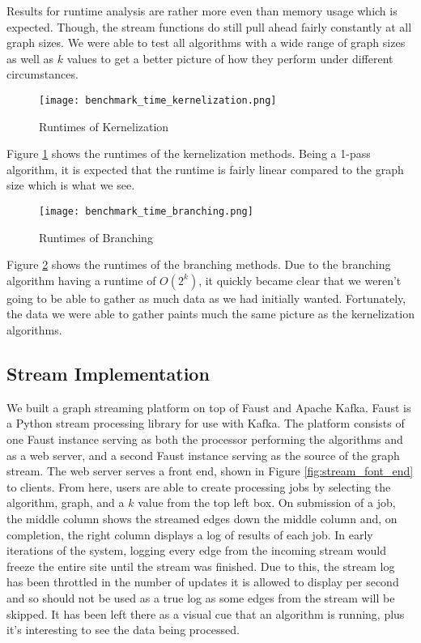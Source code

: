 Results for runtime analysis are rather more even than memory usage which is
expected. Though, the stream functions do still pull ahead fairly constantly at
all graph sizes. We were able to test all algorithms with a wide range of graph
sizes as well as \(k\) values to get a better picture of how they perform under
different circumstances.

\begin{figure}[htb]
    \centering
    \texttt{[image: benchmark\_time\_kernelization.png]}
    \caption{Runtimes of Kernelization}
    \label{fig:benchmark_time_kernelization}
\end{figure}

Figure \ref{fig:benchmark_time_kernelization} shows the runtimes of the
kernelization methods. Being a 1-pass algorithm, it is expected that the
runtime is fairly linear compared to the graph size which is what we see.

\begin{figure}[htb]
    \centering
    \texttt{[image: benchmark\_time\_branching.png]}
    \caption{Runtimes of Branching}
    \label{fig:benchmark_time_branching}
\end{figure}

Figure \ref{fig:benchmark_time_branching} shows the runtimes of the branching
methods. Due to the branching algorithm having a runtime of \(O(2^k)\), it
quickly became clear that we weren't going to be able to gather as much data as
we had initially wanted. Fortunately, the data we were able to gather paints
much the same picture as the kernelization algorithms.

\subsection{Stream Implementation}

We built a graph streaming platform on top of Faust and Apache Kafka. Faust is
a Python stream processing library for use with Kafka. The platform consists of
one Faust instance serving as both the processor performing the algorithms and
as a web server, and a second Faust instance serving as the source of the graph
stream. The web server serves a front end, shown in Figure
\ref{fig:stream_font_end} to clients. From here, users are able to create
processing jobs by selecting the algorithm, graph, and a \(k\) value from the
top left box. On submission of a job, the middle column shows the streamed
edges down the middle column and, on completion, the right column displays a
log of results of each job. In early iterations of the system, logging every
edge from the incoming stream would freeze the entire site until the stream was
finished. Due to this, the stream log has been throttled in the number of
updates it is allowed to display per second and so should not be used as a true
log as some edges from the stream will be skipped. It has been left there as a
visual cue that an algorithm is running, plus it's interesting to see the data
being processed.

